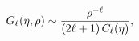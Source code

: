 \[\mathop{G_{\ell}\/}\nolimits\!\left(\eta,\rho\right)\sim\frac{\rho^{-\ell}}{(2%
\ell+1)\mathop{C_{\ell}\/}\nolimits\!\left(\eta\right)},\]